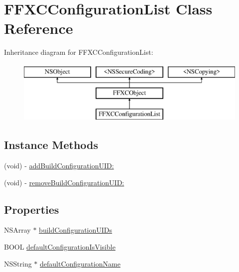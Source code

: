 \hypertarget{interface_f_f_x_c_configuration_list}{\section{F\-F\-X\-C\-Configuration\-List Class Reference}
\label{interface_f_f_x_c_configuration_list}
}
Inheritance diagram for F\-F\-X\-C\-Configuration\-List\-:\begin{figure}[H]
\begin{center}
\leavevmode
\includegraphics[height=3.000000cm]{interface_f_f_x_c_configuration_list}
\end{center}
\end{figure}
\subsection*{Instance Methods}
\begin{DoxyCompactItemize}
\item 
(void) -\/ \hyperlink{interface_f_f_x_c_configuration_list_a5bdd1646f874e219f9d35b7307e6be44}{add\-Build\-Configuration\-U\-I\-D\-:}
\item 
(void) -\/ \hyperlink{interface_f_f_x_c_configuration_list_adb9a5da1f8159ad4251b07f035fe1c23}{remove\-Build\-Configuration\-U\-I\-D\-:}
\end{DoxyCompactItemize}
\subsection*{Properties}
\begin{DoxyCompactItemize}
\item 
N\-S\-Array $\ast$ \hyperlink{interface_f_f_x_c_configuration_list_ae4fc25030483b80f27f94964838dff80}{build\-Configuration\-U\-I\-Ds}
\item 
B\-O\-O\-L \hyperlink{interface_f_f_x_c_configuration_list_acbd85703d18dd26a7ee2ece4a8845886}{default\-Configuration\-Is\-Visible}
\item 
N\-S\-String $\ast$ \hyperlink{interface_f_f_x_c_configuration_list_a81391b97ff59d1c9fe7bb5e0915af00e}{default\-Configuration\-Name}
\end{DoxyCompactItemize}


